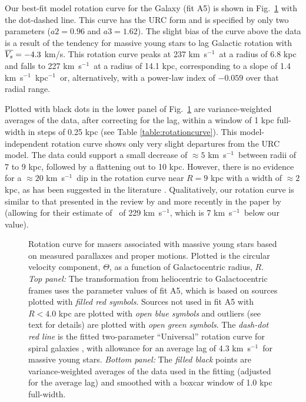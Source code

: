 \documentclass[12pt,preprint]{aastex}
\def\kms  {km~s$^{-1}$}
\def\kmskpc    {km~s$^{-1}$~kpc$^{-1}$}
\def\eg   {e.g.,~}
\def\Vsbar {\ifmmode {\overline{V_s}}\else {$\overline{V_s}$}\fi}
\def\To    {\ifmmode{\Theta_0}\else{$\Theta_0$}\fi}
\begin{document}
Our best-fit model rotation curve for the Galaxy (fit A5) is shown in Fig.~\ref{fig:rotationcurve}
with the dot-dashed line.  This curve has the URC form and is specified by only two 
parameters ($a2=0.96$ and $a3=1.62$).  The slight bias of the curve above the data 
is a result of the tendency for massive young stars to lag Galactic rotation 
with $\Vsbar=-4.3$ km/s.  This rotation curve peaks at 237 \kms\ at a radius of 6.8 kpc 
and falls to 227 \kms\ at a radius of 14.1 kpc, corresponding to a slope of 1.4 \kmskpc\ or, 
alternatively, with a power-law index of $-0.059$ over that radial range. 

Plotted with black dots in the lower panel of Fig.~\ref{fig:rotationcurve} are 
variance-weighted averages of the data, after correcting for the lag, 
within a window of 1 kpc full-width in steps of 0.25 kpc 
(see Table \ref{table:rotationcurve}).  This model-independent rotation curve shows only 
very slight departures from the URC model.  The data could support 
a small decrease of $\approx5$ \kms\ between radii of 7 to 9 kpc, followed by a flattening 
out to 10 kpc.  However, there is no evidence for a $\approx20$ \kms\ dip in the rotation 
curve near $R=9$ kpc with a width of $\approx 2$ kpc, as has been suggested in the literature 
\citep[\eg][]{Sofue:09}.  Qualitatively, our rotation curve is similar to that
presented in the review by \citet{Bland-Hawthorn:16} and more recently in the paper
by \citet{Eilers:19} (allowing for their estimate of \To\ of 229 \kms, which is 
7 \kms\ below our value).

\begin{figure}[htp]
\caption{\small
Rotation curve for masers associated with massive young stars based on measured parallaxes
and proper motions.  Plotted is the circular velocity component, $\Theta$, 
as a function of Galactocentric radius, $R$.  
{\it Top panel:} The transformation from heliocentric to Galactocentric frames uses the 
parameter values of fit A5, which is based on sources plotted with 
{\it filled red symbols}.
Sources not used in fit A5 with $R<4.0$ kpc are plotted with {\it open blue symbols}
and outliers (see text for details) are plotted with {\it open green symbols}.
The {\it dash-dot red line} is the fitted two-parameter ``Universal'' rotation curve
for spiral galaxies \citep{Persic:96}, with allowance for an average lag of 4.3
\kms\ for massive young stars.  {\it Bottom panel:} The {\it filled black} points are 
variance-weighted averages of the data used in the fitting (adjusted for the average lag) 
and smoothed with a boxcar window of 1.0 kpc full-width.
        } 
\label{fig:rotationcurve}
\end{figure}
\end{document}

